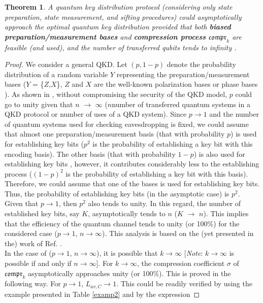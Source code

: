 \documentclass[journal,onecolumn]{IEEEtran}
\theoremstyle{thmstyleone}%
\newtheorem{theorem}{Theorem}
\theoremstyle{thmstyletwo}%
\theoremstyle{thmstylethree}%
\begin{document}
	\begin{theorem}
		A quantum key distribution protocol (considering only state preparation, state measurement, and sifting procedures) could asymptotically approach the optimal quantum key distribution provided that both \textbf{biased preparation/measurement bases}  and \textbf{compression process $\mathfrak{compr}_k$} are feasible (and used), and the number of transferred qubits tends to infinity . 
	\end{theorem}
	\begin{proof}
		We consider a general QKD. Let $(p,\text{1}-p)$ denote the probability distribution of a random variable $Y$ representing the preparation/measurement bases ($Y$ = \{$Z$,$X$\}, $Z$ and $X$ are the well-known polarization bases \cite{Bennett1984} or phase bases \cite{Lucamarini2018}).  As shown in \cite{Lo2005}, without compromising the security of the QKD model, $p$ could go to unity given that $n$ $\rightarrow$ $\infty$ ($n$\textemdash number of transferred quantum systems in a QKD protocol or number of uses of a QKD system). Since $p\rightarrow \text{1}$ and the number of quantum systems used for checking eavesdropping is fixed, we could assume that almost one preparation/measurement basis (that with probability $p$) is used
		for establishing key bits ($p^{\text{2}}$ is the probability of establishing a key bit with this encoding basis). The other basis (that with probability $\text{1}-p$) is also used for establishing key bits \cite{Lo2005}, however, it contributes considerably less to the establishing process ($(\text{1}-p)^{\text{2}}$ is the probability of establishing a key bit with this basis).
		Therefore, we could assume that one of the bases is used for establishing key bits. Thus, the probability of establishing key bits (in the asymptotic case) is $p^{\text{2}}$. Given that $p\rightarrow \text{1}$, then $p^{\text{2}}$ also tends to unity. In this regard, the number of established key bits, say $K$, asymptotically tends to $n$ ($K$ $\rightarrow$ $n$). This implies that the efficiency of the quantum channel tends to unity (or 100\%) for the considered case ($p\rightarrow \text{1}$, $n\rightarrow\infty$). This analysis is based on the (yet presented in the) work of Ref. \cite{Lo2005}.\\
		\indent In the case of ($p\rightarrow \text{1}$, $n\rightarrow\infty$), it is possible that $k\rightarrow\infty$ [\textit{Note}: $k\rightarrow\infty$ is possible if and only if  $n\rightarrow\infty$]. For $k\rightarrow\infty$, the compression coefficient $\sigma$ of $\mathfrak{compr}_k$ asymptotically approaches unity (or 100\%). This is proved in the following way. For $p\rightarrow\text{1}$, $L_{av,C}\rightarrow\text{1}$. This could be readily verified by using the example presented in Table \ref{examp2} and by the expression

\end{proof}
\end{document}

